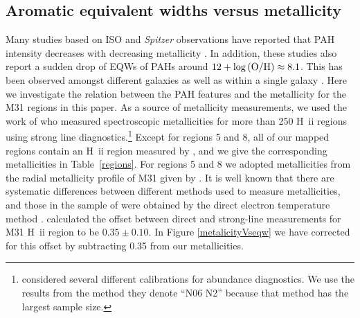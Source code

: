 \subsection{Aromatic equivalent widths versus metallicity}
\label{sect:eqw_met}


Many studies based on ISO and {\em Spitzer} observations have reported that PAH intensity decreases with decreasing metallicity \citep{Calzetti:2010fk}. 
In addition, these studies also report a sudden drop of EQWs of PAHs around $12+\log{\rm (O/H)} \approx 8.1$. 
This has been observed amongst different galaxies \citep{Engelbracht_2008} as well as within a single galaxy \citep{Gordon:2008lr}. 
Here we investigate the relation between the PAH features and the metallicity for the M31 regions in this paper. 
As a source of metallicity measurements, we used the work of \citet{Sanders_2011} who measured spectroscopic metallicities for
more than 250 H~{\sc ii} regions using strong line diagnostics.\footnote{\citet{Sanders_2011} considered several different
calibrations for abundance diagnostics. We use the results from the method they denote ``N06 N2''  \citep{Nagao2006} because
that method has the largest sample size.} Except for regions 5 and 8, all of our mapped regions contain an  H~{\sc ii} region measured by
 \citet{Sanders_2011}, and we give the corresponding metallicities in Table~\ref{regions}.
 For regions 5 and 8 we adopted metallicities from the radial metallicity profile of M31 given by
 \citet{Sanders_2011}. It is well known that there are systematic differences between different 
 methods used to measure metallicities, and those in the sample of \citet{Engelbracht_2008} 
 were obtained by the direct electron temperature method  \citep{Skillman1998}.
\citet{Mitchel2014} calculated the offset between direct and strong-line measurements for M31 H~{\sc ii} region to be 
$0.35\pm0.10$. In Figure \ref{metalicityVseqw} we have corrected for this offset  by subtracting 0.35 from our metallicities. 


